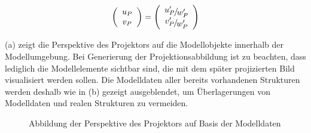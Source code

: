 \begin{equation}
\left(\begin{array}{c}
u_P\\
v_P
\end{array}\right)
=
\left(\begin{array}{c}
\nicefrac{u_P'}{w_P'}\\
\nicefrac{v_P'}{w_P'}
\end{array}\right)
\end{equation}

 (a) zeigt die Perspektive des Projektors auf die Modellobjekte innerhalb der Modellumgebung. Bei Generierung der Projektionsabbildung ist zu beachten, dass lediglich die Modellelemente sichtbar sind, die mit dem später projizierten Bild visualisiert werden sollen. Die Modelldaten aller bereits vorhandenen Strukturen werden deshalb wie in  (b) gezeigt ausgeblendet, um Überlagerungen von Modelldaten und realen Strukturen zu vermeiden.


\begin{figure}[!ht]
	\begin{center}
	\hspace{5mm}
	\caption{Abbildung der Perspektive des Projektors auf Basis der Modelldaten}
	\label{fig.projpersp_gui}
	\end{center}
\end{figure}%
%
%
%
%

